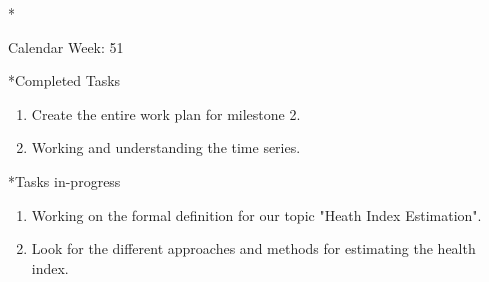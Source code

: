 \documentclass[11pt,a4paper]{article}
\begin{document}
\newpage
\begin{section}*{Calendar Week: 51 \hfill \date{18 December, 2020}}

\begin{subsection}*{Completed Tasks}
    \begin{enumerate}
        \item
            Create the entire work plan for milestone 2.
        \item
            Working and understanding the time series.
    \end{enumerate}
\end{subsection}

\begin{subsection}*{Tasks in-progress}
    \begin{enumerate}
        \item
            Working on the formal definition for our topic "Heath Index Estimation".
        \item
            Look for the different approaches and methods for estimating the health index.
    \end{enumerate}
\end{subsection}
\end{section}
\end{document}
